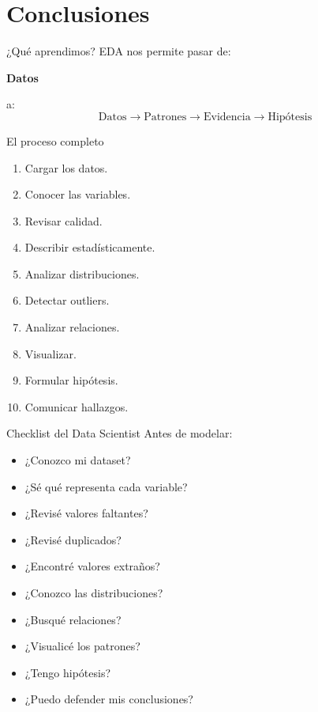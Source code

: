 \documentclass[aspectratio=169,11pt]{beamer}
\begin{document}
\section{Conclusiones}
\begin{frame}{¿Qué aprendimos?}
EDA nos permite pasar de:
\begin{center}
\Large
\textbf{Datos}
\end{center}
a:
\[
\boxed{
\text{Datos}
\rightarrow
\text{Patrones}
\rightarrow
\text{Evidencia}
\rightarrow
\text{Hipótesis}
}
\]
\end{frame}
\begin{frame}{El proceso completo}
\begin{enumerate}
    \item Cargar los datos.
    \item Conocer las variables.
    \item Revisar calidad.
    \item Describir estadísticamente.
    \item Analizar distribuciones.
    \item Detectar outliers.
    \item Analizar relaciones.
    \item Visualizar.
    \item Formular hipótesis.
    \item Comunicar hallazgos.
\end{enumerate}
\end{frame}
\begin{frame}{Checklist del Data Scientist}
Antes de modelar:
\begin{itemize}
    \item[$\square$] ¿Conozco mi dataset?
    \item[$\square$] ¿Sé qué representa cada variable?
    \item[$\square$] ¿Revisé valores faltantes?
    \item[$\square$] ¿Revisé duplicados?
    \item[$\square$] ¿Encontré valores extraños?
    \item[$\square$] ¿Conozco las distribuciones?
    \item[$\square$] ¿Busqué relaciones?
    \item[$\square$] ¿Visualicé los patrones?
    \item[$\square$] ¿Tengo hipótesis?
    \item[$\square$] ¿Puedo defender mis conclusiones?
\end{itemize}
\end{frame}
\end{document}
